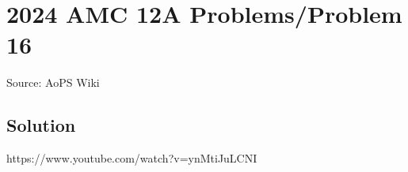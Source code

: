 \documentclass[12pt]{article}
\begin{document}
\section*{{2024 AMC 12A Problems/Problem 16}}
Source: AoPS Wiki

\subsection*{Solution}
https://www.youtube.com/watch?v=ynMtiJuLCNI
\end{document}
